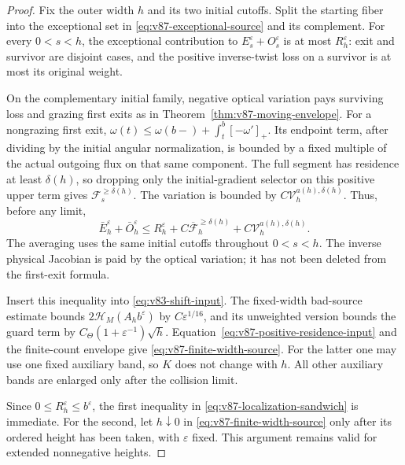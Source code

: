 \begin{proof}
Fix the outer width $h$ and its two initial cutoffs. Split the starting
fiber into the exceptional set in \eqref{eq:v87-exceptional-source}
and its complement. For every $0<s<h$, the exceptional contribution
to $E_s^\varepsilon+O_s^\varepsilon$ is at most $R_h^\varepsilon$:
exit and survivor are disjoint cases, and the positive inverse-twist
loss on a survivor is at most its original weight.

On the complementary initial family, negative optical variation pays
surviving loss and grazing first exits as in
Theorem~\ref{thm:v87-moving-envelope}. For a nongrazing first exit,
$\omega(t)\le\omega(b-)+\int_t^b[-\omega']_+$. Its endpoint term,
after dividing by the initial angular normalization, is bounded by a
fixed multiple of the actual outgoing flux on that same component.
The full segment has residence at least $\delta(h)$, so dropping
only the initial-gradient selector on this positive upper term gives
$\mathcal F_s^{\ge\delta(h)}$. The variation is bounded by
$C\mathcal V_h^{a(h),\delta(h)}$. Thus, before any limit,
\[
 \bar E_h^\varepsilon+\bar O_h^\varepsilon
 \le R_h^\varepsilon+C\overline{\mathcal F}_h^{\ge\delta(h)}
                         +C\mathcal V_h^{a(h),\delta(h)}.
\]
The averaging uses the same initial cutoffs throughout $0<s<h$.
The inverse physical Jacobian is paid by the optical variation;
it has not been deleted from the first-exit formula.

Insert this inequality into \eqref{eq:v83-shift-input}. The fixed-width
bad-source estimate bounds $2\mathcal H_M(A_hb^\varepsilon)$ by
$C\varepsilon^{1/16}$, and its unweighted version bounds the guard
term by $C_\Theta(1+\varepsilon^{-1})\sqrt h$.
Equation~\eqref{eq:v87-positive-residence-input} and the finite-count
envelope give \eqref{eq:v87-finite-width-source}. For the latter one
may use one fixed auxiliary band, so $K$ does not change with $h$.
All other auxiliary bands are enlarged only after the collision limit.

Since $0\le R_h^\varepsilon\le b^\varepsilon$, the first inequality
in \eqref{eq:v87-localization-sandwich} is immediate. For the second,
let $h\downarrow0$ in \eqref{eq:v87-finite-width-source} only after
its ordered height has been taken, with $\varepsilon$ fixed.
This argument remains valid for extended nonnegative heights.
\end{proof}

